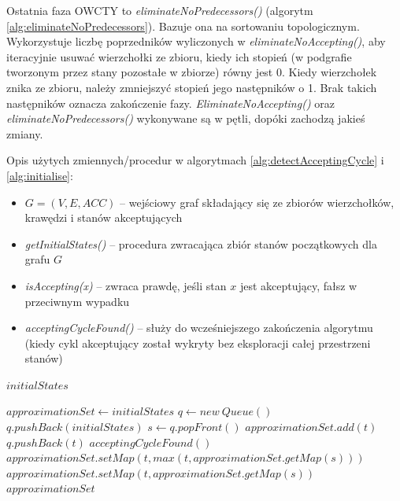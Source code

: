 Ostatnia faza OWCTY to \textit{eliminateNoPredecessors()} (algorytm \ref{alg:eliminateNoPredecessors}).
Bazuje ona na sortowaniu topologicznym.
Wykorzystuje liczbę poprzedników wyliczonych w \textit{eliminateNoAccepting()}, aby iteracyjnie usuwać wierzchołki ze zbioru, kiedy ich stopień (w podgrafie tworzonym przez stany pozostałe w zbiorze) równy jest 0.
Kiedy wierzchołek znika ze zbioru, należy zmniejszyć stopień jego następników o 1.
Brak takich następników oznacza zakończenie fazy.
\textit{EliminateNoAccepting()} oraz \textit{eliminateNoPredecessors()} wykonywane są w pętli, dopóki zachodzą jakieś zmiany.

\noindent
Opis użytych zmiennych/procedur w algorytmach \ref{alg:detectAcceptingCycle} i \ref{alg:initialise}:
\begin{itemize}
\item $ G = (V,E,ACC) $ -- wejściowy graf składający się ze zbiorów wierzchołków, krawędzi i stanów akceptujących
\item \textit{getInitialStates()} -- procedura zwracająca zbiór stanów początkowych dla grafu $G$
\item \textit{isAccepting(x)} -- zwraca prawdę, jeśli stan $x$ jest akceptujący, fałsz w przeciwnym wypadku
\item \textit{acceptingCycleFound()} -- służy do wcześniejszego zakończenia algorytmu (kiedy cykl akceptujący został wykryty bez eksploracji całej przestrzeni stanów)
\end{itemize}

\begin{algorithm}
\caption{$ initialise(initialStates) $}
\label{alg:initialise}
\begin{algorithmic}[1]
\REQUIRE $ initialStates $

\STATE $ approximationSet \leftarrow initialStates $
\STATE $ q \leftarrow new\ Queue() $
\STATE $ q.pushBack(initialStates) $
  \STATE $ s \leftarrow q.popFront() $
      \STATE $ approximationSet.add(t) $
      \STATE $ q.pushBack(t) $
    \ENDIF
        \STATE $ acceptingCycleFound() $
        \RETURN
      \ENDIF
      \STATE $ approximationSet.setMap(t, max(t, approximationSet.getMap(s))) $
    \ELSE
      \STATE $ approximationSet.setMap(t, approximationSet.getMap(s)) $
    \ENDIF
  \ENDFOR
\ENDWHILE
\RETURN $ approximationSet $
\end{algorithmic}
\end{algorithm}


